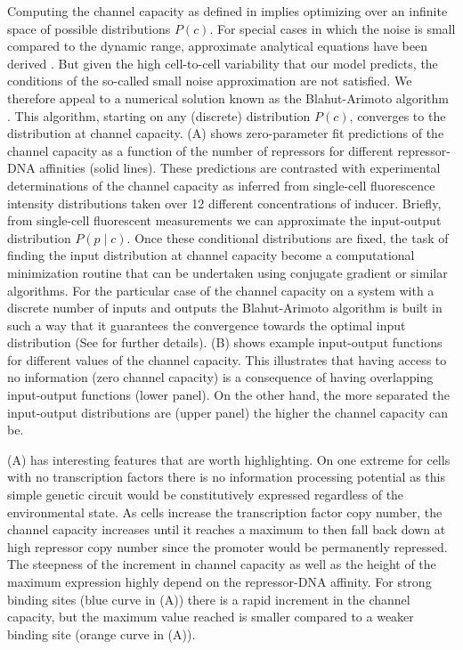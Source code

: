 Computing the channel capacity as defined in  implies
optimizing over an infinite space of possible distributions $P(c)$. For special
cases in which the noise is small compared to the dynamic range, approximate
analytical equations have been derived \cite{Tkacik2008a}. But given the high
cell-to-cell variability that our model predicts, the conditions of the
so-called small noise approximation are not satisfied. We therefore appeal to a
numerical solution known as the Blahut-Arimoto algorithm \cite{Blahut1972}. This
algorithm, starting on any (discrete) distribution $P(c)$, converges to the
distribution at channel capacity. (A) shows zero-parameter
fit predictions of the channel capacity as a function of the number of
repressors for different repressor-DNA affinities (solid lines). These
predictions are contrasted with experimental determinations of the channel
capacity as inferred from single-cell fluorescence intensity distributions taken
over 12 different concentrations of inducer. Briefly, from single-cell
fluorescent measurements we can approximate the input-output distribution $P(p
\mid c)$. Once these conditional distributions are fixed, the task of finding
the input distribution at channel capacity become a computational minimization
routine that can be undertaken using conjugate gradient or similar algorithms.
For the particular case of the channel capacity on a system with a discrete
number of inputs and outputs the Blahut-Arimoto algorithm is built in such a way
that it guarantees the convergence towards the optimal input distribution (See
 for further details). (B) shows
example input-output functions for different values of the channel capacity.
This illustrates that having access to no information (zero channel capacity) is
a consequence of having overlapping input-output functions (lower panel). On the
other hand, the more separated the input-output distributions are (upper panel)
the higher the channel capacity can be.

(A) has interesting features that are worth highlighting. On
one extreme for cells with no transcription factors there is no information
processing potential as this simple genetic circuit would be constitutively
expressed regardless of the environmental state. As cells increase the
transcription factor copy number, the channel capacity increases until it
reaches a maximum to then fall back down at high repressor copy number since the
promoter would be permanently repressed. The steepness of the increment in
channel capacity as well as the height of the maximum expression highly depend
on the repressor-DNA affinity. For strong binding sites (blue curve in
(A)) there is a rapid increment in the channel capacity, but
the maximum value reached is smaller compared to a weaker binding site (orange
curve in (A)).

